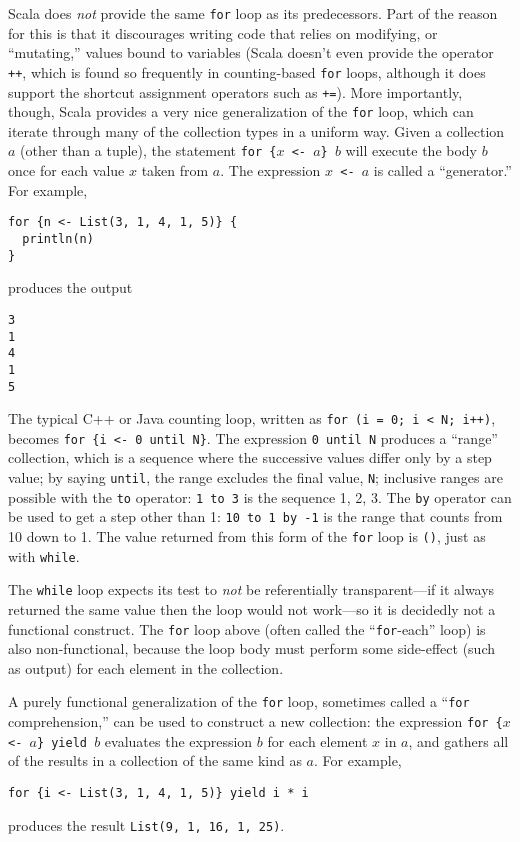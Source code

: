 Scala does \emph{not} provide the same \texttt{for} loop as its predecessors. Part of the reason for this is that it discourages writing code that relies on modifying, or ``mutating,'' values bound to variables (Scala doesn't even provide the operator \texttt{++}, which is found so frequently in counting-based \texttt{for} loops, although it does support the shortcut assignment operators such as \texttt{+=}). More importantly, though, Scala provides a very nice generalization of the \texttt{for} loop, which can iterate through many of the collection types in a uniform way. Given a collection $a$ (other than a tuple), the statement \texttt{for \{$x$ <- $a$\} $b$} will execute the body $b$ once for each value $x$ taken from $a$. The expression \texttt{$x$ <- $a$} is called a ``generator.'' For example,
\begin{verbatim}
for {n <- List(3, 1, 4, 1, 5)} {
  println(n)
}
\end{verbatim}
produces the output
\begin{verbatim}
3
1
4
1
5
\end{verbatim}
The typical C++ or Java counting loop, written as \texttt{for (i = 0; i < N; i++)}, becomes \texttt{for \{i <- 0 until N\}}. The expression \texttt{0 until N} produces a ``range'' collection, which is a sequence where the successive values differ only by a step value; by saying \texttt{until}, the range excludes the final value, \texttt{N}; inclusive ranges are possible with the \texttt{to} operator: \texttt{1 to 3} is the sequence 1, 2, 3. The \texttt{by} operator can be used to get a step other than 1: \texttt{10 to 1 by -1} is the range that counts from 10 down to 1. The value returned from this form of the \texttt{for} loop is \texttt{()}, just as with \texttt{while}.

The \verb|while| loop expects its test to \emph{not} be referentially transparent---if it always returned the same value then the loop would not work---so it is decidedly not a functional construct. The \verb|for| loop above (often called the ``\verb|for|-each'' loop) is also non-functional, because the loop body must perform some side-effect (such as output) for each element in the collection.

A purely functional generalization of the \texttt{for} loop, sometimes called a ``\texttt{for} comprehension,'' can be used to construct a new collection: the expression \texttt{for \{$x$ <- $a$\} yield $b$} evaluates the expression $b$ for each element $x$ in $a$, and gathers all of the results in a collection of the same kind as $a$. For example,
\begin{verbatim}
for {i <- List(3, 1, 4, 1, 5)} yield i * i
\end{verbatim}
produces the result \texttt{List(9, 1, 16, 1, 25)}.

